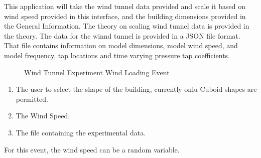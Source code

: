 This application will take the wind tunnel data provided and scale it based on wind speed provided in this interface, and the building dimensions provided in the General Information. The theory on scaling wind tunnel data is provided in the theory. The data for the winnd tunnel is provided in a JSON file format. That file contains information on model dimensions, model wind speed, and model frequency, tap locations and time varying pressure tap coefficients.

\begin{figure}[!htbp]
  \caption{Wind Tunnel Experiment  Wind Loading Event}
  \label{fig:dedm_hrp}
\end{figure}

\begin{enumerate} 
\item The user to select the shape of the building, currently onlu Cuboid shapes are permitted.
\item The Wind Speed.
\item The file containing the experimental data.
\end{enumerate}

For this event, the wind speed can be a random variable.




